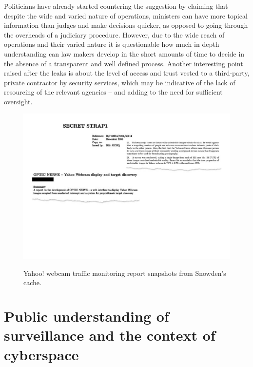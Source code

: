 \documentclass{llncs}
\begin{document}
Politicians have already started countering the suggestion by claiming that despite the wide and varied nature of operations, ministers can have more topical information than judges and make decisions quicker, as opposed to going through the overheads of a judiciary procedure. However, due to the wide reach of operations and their varied nature it is questionable how much in depth understanding can law makers develop in the short amounts of time to decide in the absence of a transparent and well defined process. Another interesting point raised after the leaks is about the level of access and trust vested to a third-party, private contractor by security services, which may be indicative of the lack of resourcing of the relevant agencies -- and adding to the need for sufficient oversight.
\begin{figure}
\begin{center}
\label{fig:Yahoo}
\includegraphics[scale=0.3]{fig1}
\caption{Yahoo! webcam traffic monitoring report snapshots from Snowden's cache.}
\end{center}
\end{figure}

\section{Public understanding of surveillance and the context of cyberspace}
\label{sec:Understanding}
\end{document}
